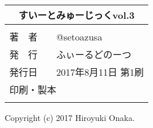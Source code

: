 \newpage
\pagestyle{fancy}
\lhead[]{}
\chead[]{}
\rhead[]{}


\newpage
\pagestyle{fancy}
\lhead[]{}
\chead[]{}
\rhead[]{}

\begin{center}
    \vspace*{115mm} %

\begin{tabular}{l}
\multicolumn{1}{c}{\Large{すいーとみゅーじっくvol.3}}\\[3mm] %
\hline
\\[-3mm]
\hspace{2mm}\large{著　者　　}\hspace{5mm}@setoazusa\\[0mm] 
\hspace{2mm}\large{発　行　　}\hspace{5mm}ふぃーるどのーつ\\[0mm] 
\hspace{2mm}\large{発行日　　}\hspace{5mm}2017年8月11日 第1刷\\[0mm]
\hspace{2mm}\large{印刷・製本}\hspace{5mm}{日光企画}\\[0mm]
\\\hline
\end{tabular}
\end{center}
\begin{center}
Copyright (c) 2017 Hiroyuki Onaka.
\end{center}
